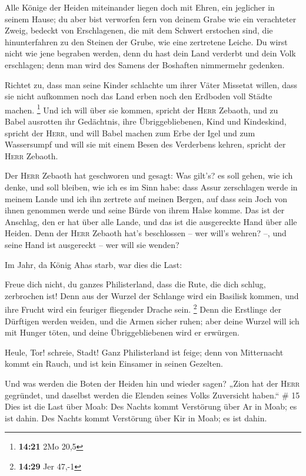  Alle Könige der Heiden miteinander liegen doch mit
Ehren, ein jeglicher in seinem Hause;  du aber bist
verworfen fern von deinem Grabe wie ein verachteter Zweig, bedeckt von
Erschlagenen, die mit dem Schwert erstochen sind, die hinunterfahren zu
den Steinen der Grube, wie eine zertretene Leiche.  Du
wirst nicht wie jene begraben werden, denn du hast dein Land verderbt
und dein Volk erschlagen; denn man wird des Samens der Boshaften
nimmermehr gedenken.

 Richtet zu, dass man seine Kinder schlachte um ihrer
Väter Missetat willen, dass sie nicht aufkommen noch das Land erben noch
den Erdboden voll Städte machen. \footnote{\textbf{14:21} 2Mo 20,5}
 Und ich will über sie kommen, spricht der \textsc{Herr}
Zebaoth, und zu Babel ausrotten ihr Gedächtnis, ihre Übriggebliebenen,
Kind und Kindeskind, spricht der \textsc{Herr},  und will
Babel machen zum Erbe der Igel und zum Wassersumpf und will sie mit
einem Besen des Verderbens kehren, spricht der \textsc{Herr} Zebaoth.

 Der \textsc{Herr} Zebaoth hat geschworen und gesagt: Was
gilt's? es soll gehen, wie ich denke, und soll bleiben, wie ich es im
Sinn habe:  dass Assur zerschlagen werde in meinem Lande
und ich ihn zertrete auf meinen Bergen, auf dass sein Joch von ihnen
genommen werde und seine Bürde von ihrem Halse komme. 
Das ist der Anschlag, den er hat über alle Lande, und das ist die
ausgereckte Hand über alle Heiden.  Denn der
\textsc{Herr} Zebaoth hat's beschlossen -- wer will's wehren? --, und
seine Hand ist ausgereckt -- wer will sie wenden?

 Im Jahr, da König Ahas starb, war dies die Last:

 Freue dich nicht, du ganzes Philisterland, dass die
Rute, die dich schlug, zerbrochen ist! Denn aus der Wurzel der Schlange
wird ein Basilisk kommen, und ihre Frucht wird ein feuriger fliegender
Drache sein. \footnote{\textbf{14:29} Jer 47,-1}  Denn
die Erstlinge der Dürftigen werden weiden, und die Armen sicher ruhen;
aber deine Wurzel will ich mit Hunger töten, und deine Übriggebliebenen
wird er erwürgen.

 Heule, Tor! schreie, Stadt! Ganz Philisterland ist
feige; denn von Mitternacht kommt ein Rauch, und ist kein Einsamer in
seinen Gezelten.

 Und was werden die Boten der Heiden hin und wieder
sagen? „Zion hat der \textsc{Herr} gegründet, und daselbst werden die
Elenden seines Volks Zuversicht haben.`` \# 15  Dies ist
die Last über Moab: Des Nachts kommt Verstörung über Ar in Moab; es ist
dahin. Des Nachts kommt Verstörung über Kir in Moab; es ist dahin.

